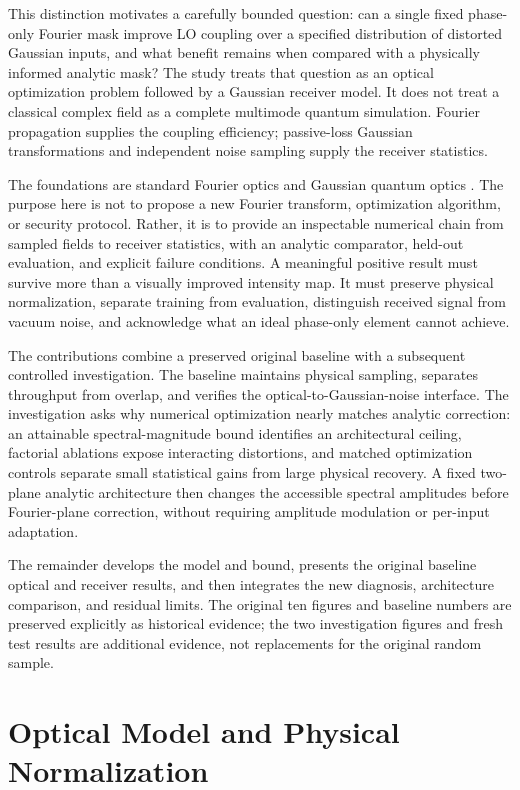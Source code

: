 \documentclass[journal]{IEEEtran}
\begin{document}
This distinction motivates a carefully bounded question: can a single fixed phase-only Fourier mask improve LO coupling over a specified distribution of distorted Gaussian inputs, and what benefit remains when compared with a physically informed analytic mask? The study treats that question as an optical optimization problem followed by a Gaussian receiver model. It does not treat a classical complex field as a complete multimode quantum simulation. Fourier propagation supplies the coupling efficiency; passive-loss Gaussian transformations and independent noise sampling supply the receiver statistics.

The foundations are standard Fourier optics and Gaussian quantum optics \cite{goodman,weedbrook}. The purpose here is not to propose a new Fourier transform, optimization algorithm, or security protocol. Rather, it is to provide an inspectable numerical chain from sampled fields to receiver statistics, with an analytic comparator, held-out evaluation, and explicit failure conditions. A meaningful positive result must survive more than a visually improved intensity map. It must preserve physical normalization, separate training from evaluation, distinguish received signal from vacuum noise, and acknowledge what an ideal phase-only element cannot achieve.

The contributions combine a preserved original baseline with a subsequent controlled investigation. The baseline maintains physical sampling, separates throughput from overlap, and verifies the optical-to-Gaussian-noise interface. The investigation asks why numerical optimization nearly matches analytic correction: an attainable spectral-magnitude bound identifies an architectural ceiling, factorial ablations expose interacting distortions, and matched optimization controls separate small statistical gains from large physical recovery. A fixed two-plane analytic architecture then changes the accessible spectral amplitudes before Fourier-plane correction, without requiring amplitude modulation or per-input adaptation.

The remainder develops the model and bound, presents the original baseline optical and receiver results, and then integrates the new diagnosis, architecture comparison, and residual limits. The original ten figures and baseline numbers are preserved explicitly as historical evidence; the two investigation figures and fresh test results are additional evidence, not replacements for the original random sample.

\section{Optical Model and Physical Normalization}
\end{document}
